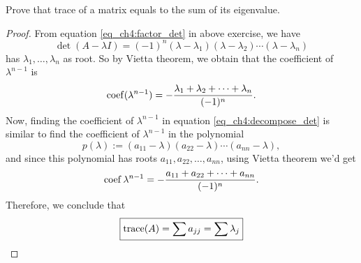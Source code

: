 \documentclass{article}
\begin{document}
\begin{exercise}
  Prove that trace of a matrix equals to the sum of its
  eigenvalue.
\end{exercise}
\begin{proof}
  From equation \eqref{eq_ch4:factor_det} in above exercise, 
  we have
  \[
    \det(A-\lambda I)
    =(-1)^n (\lambda-\lambda_1)(\lambda-\lambda_2)\cdots(\lambda-\lambda_n)
  \]
  has $\lambda_1,\dots,\lambda_n$ as root. So by Vietta theorem, 
  we obtain that the coefficient of $\lambda^{n-1}$ is 
  \[
    \operatorname{coef}(\lambda^{n-1})=-\frac{\lambda_1+\lambda_2+\cdots+\lambda_n}{(-1)^n}.
  \]
  Now, finding the coefficient of $\lambda^{n-1}$ in equation 
  \eqref{eq_ch4:decompose_det} is similar to find the coefficient of 
  $\lambda^{n-1}$ in the polynomial
  \[p(\lambda):=(a_{11}-\lambda)(a_{22}-\lambda)\cdots(a_{nn}-\lambda),\]
  and since this polynomial has roots $a_{11},a_{22},\dots,a_{nn}$, using
  Vietta theorem we'd get
  \[
    \operatorname{coef}{\lambda^{n-1}}=-\frac{a_{11}+a_{22}+\cdots+a_{nn}}{(-1)^n}.
  \]
  Therefore, we conclude that 
  \[
    \boxed{\operatorname{trace}(A)=\sum a_{jj}=\sum \lambda_j}
  \]
\end{proof}
\end{document}
